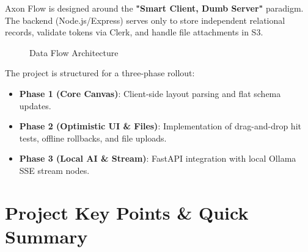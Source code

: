 \documentclass[12pt, a4paper]{article}
\begin{document}
Axon Flow is designed around the \textbf{"Smart Client, Dumb Server"} paradigm. The backend (Node.js/Express) serves only to store independent relational records, validate tokens via Clerk, and handle file attachments in S3. 

\begin{figure}[H]
  \centering
  \caption{Data Flow Architecture}
  \label{fig:data_flow}
\end{figure}

The project is structured for a three-phase rollout:
\begin{itemize}[label=\checkmark]
  \item \textbf{Phase 1 (Core Canvas)}: Client-side layout parsing and flat schema updates.
  \item \textbf{Phase 2 (Optimistic UI \& Files)}: Implementation of drag-and-drop hit tests, offline rollbacks, and file uploads.
  \item \textbf{Phase 3 (Local AI \& Stream)}: FastAPI integration with local Ollama SSE stream nodes.
\end{itemize}

\newpage
\section{Project Key Points \& Quick Summary}
\end{document}
